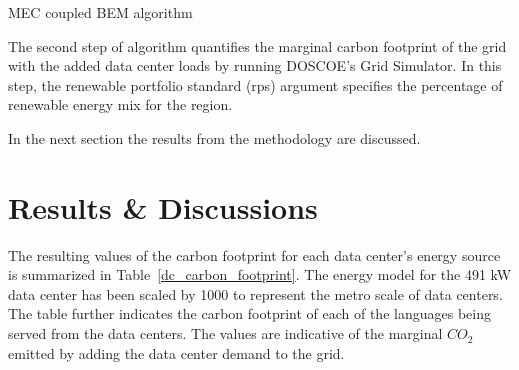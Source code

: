   \begin{algorithm}
    \begin{small}
    \caption{MEC coupled BEM algorithm}
    \label{Service Profile}
  \end{small}
  \end{algorithm}

  The second step of algorithm quantifies the marginal carbon footprint of the grid with the added data center loads by running DOSCOE’s Grid Simulator. In this step, the renewable portfolio standard (rps) argument specifies the percentage of renewable energy mix for the region.  

  In the next section the results from the methodology are discussed. 


\section{Results \& Discussions}
The resulting values of the carbon footprint for each data center's energy source is summarized in Table~\ref{dc_carbon_footprint}. The energy model for the 491 kW data center has been scaled by 1000 to represent the metro scale of data centers. The table further indicates the carbon footprint of each of the languages being served from the data centers. The values are indicative of the marginal $CO_{2}$ emitted by adding the data center demand to the grid.


